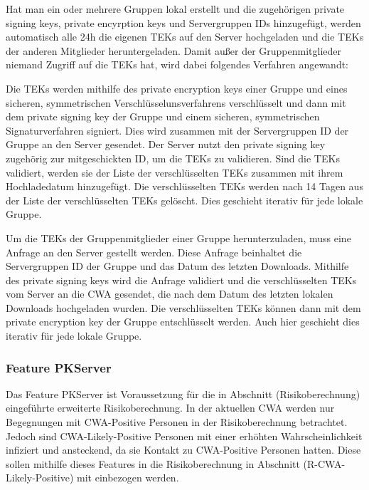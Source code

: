 \documentclass[conference]{IEEEtran}
\begin{document}
Hat man ein oder mehrere Gruppen lokal erstellt und die zugehörigen private signing keys, private encyrption keys und Servergruppen IDs hinzugefügt, werden automatisch alle 24h die eigenen TEKs auf den Server hochgeladen und die TEKs der anderen Mitglieder heruntergeladen.
Damit außer der Gruppenmitglieder niemand Zugriff auf die TEKs hat, wird dabei folgendes Verfahren angewandt:

Die TEKs werden mithilfe des private encryption keys einer Gruppe und eines sicheren, symmetrischen Verschlüsselunsverfahrens verschlüsselt und dann mit dem private signing key der Gruppe und einem sicheren, symmetrischen Signaturverfahren signiert.
Dies wird zusammen mit der Servergruppen ID der Gruppe an den Server gesendet.
Der Server nutzt den private signing key zugehörig zur mitgeschickten ID, um die TEKs zu validieren.
Sind die TEKs validiert, werden sie der Liste der verschlüsselten TEKs zusammen mit ihrem Hochladedatum hinzugefügt.
Die verschlüsselten TEKs werden nach 14 Tagen aus der Liste der verschlüsselten TEKs gelöscht.
Dies geschieht iterativ für jede lokale Gruppe.

Um die TEKs der Gruppenmitglieder einer Gruppe herunterzuladen, muss eine Anfrage an den Server gestellt werden.
Diese Anfrage beinhaltet die Servergruppen ID der Gruppe und das Datum des letzten Downloads.
Mithilfe des private signing keys wird die Anfrage validiert und die verschlüsselten TEKs vom Server an die CWA gesendet, die nach dem Datum des letzten lokalen Downloads hochgeladen wurden.
Die verschlüsselten TEKs können dann mit dem private encryption key der Gruppe entschlüsselt werden.
Auch hier geschieht dies iterativ für jede lokale Gruppe.\\


\subsubsection{Feature PKServer}

Das Feature PKServer ist Voraussetzung für die in Abschnitt (Risikoberechnung) eingeführte erweiterte Risikoberechnung.
In der aktuellen CWA werden nur Begegnungen mit CWA-Positive Personen in der Risikoberechnung betrachtet.
Jedoch sind CWA-Likely-Positive Personen mit einer erhöhten Wahrscheinlichkeit infiziert und ansteckend, da sie Kontakt zu CWA-Positive Personen hatten.
Diese sollen mithilfe dieses Features in die Risikoberechnung in Abschnitt (R-CWA-Likely-Positive) mit einbezogen werden.
\end{document}
